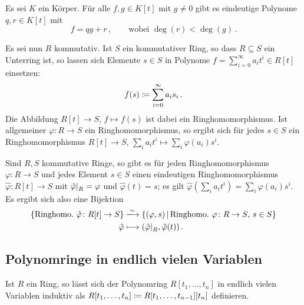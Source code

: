\begin{proposition}[Polynomdivision]
  Es sei $K$ ein Körper.
  Für alle $f, g \in K[t]$ mit $g \neq 0$ gibt es eindeutige Polynome $q, r \in K[t]$ mit
  \[
    f = qg + r \,,
    \qquad
    \text{wobei $\deg(r) < \deg(g)$} \,.
  \]
\end{proposition}

Es sei nun $R$ kommutativ.
Ist $S$ ein kommutativer Ring, so dass $R \subseteq S$ ein Unterring ist, so lassen sich Elemente $s \in S$ in Polynome $f = \sum_{i=0}^\infty a_i t^i \in R[t]$ einsetzen:
\[
            f(s)
  \coloneqq  \sum_{i=0}^\infty a_i s_i \,.
\]
Die Abbildung $R[t] \to S$, $f \mapsto f(s)$ ist dabei ein Ringhomomorphismus.
Ist allgemeiner $\varphi \colon R \to S$ ein Ringhomomorphismus, so ergibt sich für jedes $s \in S$ ein Ringhomomorphismus $R[t] \to S$, $\sum_i a_i t^i \mapsto \sum_i \varphi(a_i) s^i$.

\begin{theorem}
  Sind $R, S$ kommutative Ringe, so gibt es für jeden Ringhomomorphismus $\varphi \colon R \to S$ und jedes Element $s \in S$ einen eindeutigen Ringhomomorphismus $\hat{\varphi} \colon R[t] \to S$ mit $\restrict{\hat{\varphi}}{R} = \varphi$ und $\hat{\varphi}(t) = s$;
  es gilt $\hat{\varphi}(\sum_i a_i t^i) = \sum_i \varphi(a_i) s^i$.
  Es ergibt sich also eine Bijektion
  \begin{align*}
                                \{\text{Ringhomo.\ $\hat{\varphi} \colon R[t] \to S$}\}
    &\xlongrightarrow{\sim} \{
                              (\varphi, s)
                            \suchthat
                                \text{Ringhomo.\ $\varphi \colon R \to S$, $s \in S$}
                            \}  \\
                            \hat{\varphi}
    &\longmapsto            ( \restrict{\hat{\varphi}}{R}, \hat{\varphi}(t) ) \,.
  \end{align*}
\end{theorem}



\subsection{Polynomringe in endlich vielen Variablen}

Ist $R$ ein Ring, so lässt sich der Polynomring $R[t_1, \dotsc, t_n]$ in endlich vielen Variablen induktiv als $R[t_1, \dotsc, t_n] \coloneqq R[t_1, \dotsc, t_{n-1}][t_n]$ definieren.

